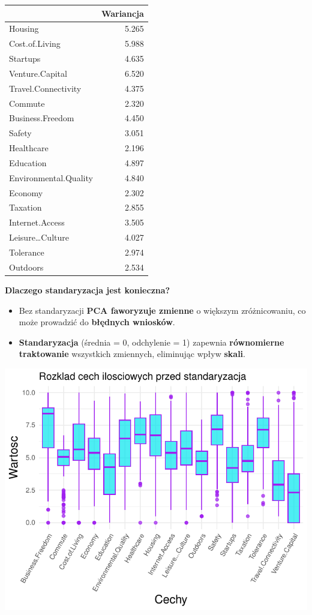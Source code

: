 \documentclass[
  12pt,
]{article}
\providecommand{\tightlist}{%
  \setlength{\itemsep}{0pt}\setlength{\parskip}{0pt}}
\begin{document}
\begin{longtable}[]{@{}lr@{}}
\toprule\noalign{}
& Wariancja \\
\midrule\noalign{}
\endhead
\bottomrule\noalign{}
\endlastfoot
Housing & 5.265 \\
Cost.of.Living & 5.988 \\
Startups & 4.635 \\
Venture.Capital & 6.520 \\
Travel.Connectivity & 4.375 \\
Commute & 2.320 \\
Business.Freedom & 4.450 \\
Safety & 3.051 \\
Healthcare & 2.196 \\
Education & 4.897 \\
Environmental.Quality & 4.840 \\
Economy & 2.302 \\
Taxation & 2.855 \\
Internet.Access & 3.505 \\
Leisure\ldots Culture & 4.027 \\
Tolerance & 2.974 \\
Outdoors & 2.534 \\
\end{longtable}

\textbf{Dlaczego standaryzacja jest konieczna?}

\begin{itemize}
\tightlist
\item
  Bez standaryzacji \textbf{PCA faworyzuje zmienne} o większym
  zróżnicowaniu, co może prowadzić do \textbf{błędnych wniosków}.
\item
  \textbf{Standaryzacja} (średnia = 0, odchylenie = 1) zapewnia
  \textbf{równomierne traktowanie} wszystkich zmiennych, eliminując
  wpływ \textbf{skali}.
\end{itemize}

\begin{center}\includegraphics{Sprawozdanie2_files/figure-latex/wykresy_rozkładów_standaryzacja_boxplot-1} \end{center}
\end{document}
